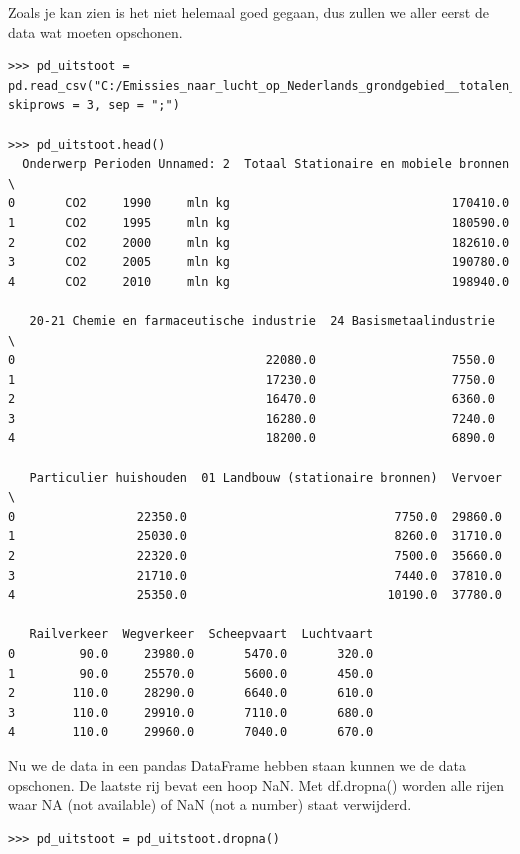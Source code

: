 Zoals je kan zien is het niet helemaal goed gegaan, dus zullen we aller eerst de data wat moeten opschonen.

\begin{lstlisting}[frame=single]
>>> pd_uitstoot = pd.read_csv("C:/Emissies_naar_lucht_op_Nederlands_grondgebied__totalen_11112018_170037.csv", skiprows = 3, sep = ";")

>>> pd_uitstoot.head()
  Onderwerp Perioden Unnamed: 2  Totaal Stationaire en mobiele bronnen  \
0       CO2     1990     mln kg                               170410.0   
1       CO2     1995     mln kg                               180590.0   
2       CO2     2000     mln kg                               182610.0   
3       CO2     2005     mln kg                               190780.0   
4       CO2     2010     mln kg                               198940.0   

   20-21 Chemie en farmaceutische industrie  24 Basismetaalindustrie  \
0                                   22080.0                   7550.0   
1                                   17230.0                   7750.0   
2                                   16470.0                   6360.0   
3                                   16280.0                   7240.0   
4                                   18200.0                   6890.0   

   Particulier huishouden  01 Landbouw (stationaire bronnen)  Vervoer  \
0                 22350.0                             7750.0  29860.0   
1                 25030.0                             8260.0  31710.0   
2                 22320.0                             7500.0  35660.0   
3                 21710.0                             7440.0  37810.0   
4                 25350.0                            10190.0  37780.0   

   Railverkeer  Wegverkeer  Scheepvaart  Luchtvaart  
0         90.0     23980.0       5470.0       320.0  
1         90.0     25570.0       5600.0       450.0  
2        110.0     28290.0       6640.0       610.0  
3        110.0     29910.0       7110.0       680.0  
4        110.0     29960.0       7040.0       670.0  

\end{lstlisting}

Nu we de data in een pandas DataFrame hebben staan kunnen we de data opschonen. De laatste rij bevat een hoop NaN. Met df.dropna() worden alle rijen waar NA (not available) of NaN (not a number) staat verwijderd.

\begin{lstlisting}[frame=single]
>>> pd_uitstoot = pd_uitstoot.dropna()
\end{lstlisting}

